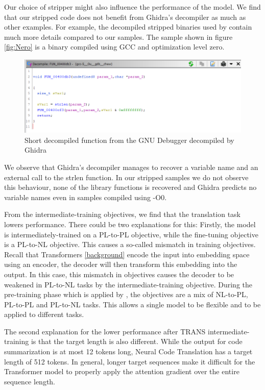 Our choice of stripper might also influence the performance of the model. We find that our stripped code does not benefit from Ghidra's decompiler as much as other examples. For example, the decompiled stripped binaries used by \citeauthor{Nero} contain much more details compared to our samples. The sample shown in figure \ref{fig:Nero} is a binary compiled using GCC and optimization level zero.

\label{fig:Nero}
\begin{figure}[!h]
  \centering
  \includegraphics[width=\linewidth]{img/Nero.png}
  \caption{Short decompiled function from the GNU Debugger \cite{Nero} decompiled by Ghidra}
\end{figure}

We observe that Ghidra's decompiler manages to recover a variable name and an external call to the strlen function. In our stripped samples we do not observe this behaviour, none of the library functions is recovered and Ghidra predicts no variable names even in samples compiled using -O0.

From the intermediate-training objectives, we find that the translation task lowers performance. There could be two explanations for this: Firstly, the model is intermediately-trained on a PL-to-PL objective, while the fine-tuning objective is a PL-to-NL objective. This causes a so-called mismatch in training objectives. Recall that Transformers \ref{background} encode the input into embedding space using an encoder, the decoder will then transform this embedding into the output. In this case, this mismatch in objectives causes the decoder to be weakened in PL-to-NL tasks by the intermediate-training objective. During the pre-training phase which is applied by \citeauthor{CodeT5}, the objectives are a mix of NL-to-PL, PL-to-PL and PL-to-NL tasks. This allows a single model to be flexible and to be applied to different tasks.

The second explanation for the lower performance after TRANS intermediate-training is that the target length is also different. While the output for code summarization is at most 12 tokens long, Neural Code Translation has a target length of 512 tokens. In general, longer target sequences make it difficult for the Transformer model to properly apply the attention gradient over the entire sequence length.

